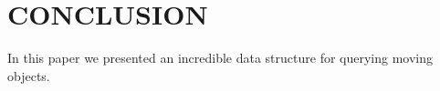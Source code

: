 \chapter{CONCLUSION}
\label{sect:conclusion}
In this paper we presented an incredible data structure for querying moving objects.